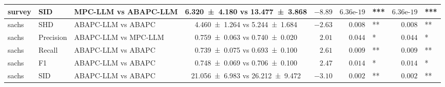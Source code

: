 \begin{table}[t]
{\begin{tabular}{ll l|c|r|rl|rl}
    survey & SID & MPC-LLM vs ABAPC-LLM & \num{6.320 +- 4.180} vs \num{13.477 +- 3.868} & $-8.89$ & $6.36\text{e-}19$ & \!\!\!*** & $6.36\text{e-}19$ & \!\!\!*** \\
    \midrule
    sachs & SHD & ABAPC-LLM vs ABAPC & \num{4.460 +- 1.264} vs \num{5.244 +- 1.684} & $-2.63$ & $0.008$ & \!\!\!** & $0.008$ & \!\!\!** \\
    sachs & Precision & ABAPC-LLM vs MPC-LLM & \num{0.759 +- 0.063} vs \num{0.740 +- 0.020} & $2.01$ & $0.044$ & \!\!\!* & $0.044$ & \!\!\!* \\
    sachs & Recall & ABAPC-LLM vs ABAPC & \num{0.739 +- 0.075} vs \num{0.693 +- 0.100} & $2.61$ & $0.009$ & \!\!\!** & $0.009$ & \!\!\!** \\
    sachs & F1 & ABAPC-LLM vs ABAPC & \num{0.748 +- 0.069} vs \num{0.706 +- 0.100} & $2.47$ & $0.014$ & \!\!\!* & $0.014$ & \!\!\!* \\
    sachs & SID & ABAPC-LLM vs ABAPC & \num{21.056 +- 6.983} vs \num{26.212 +- 9.472} & $-3.10$ & $0.002$ & \!\!\!** & $0.002$ & \!\!\!** \\
    \bottomrule
    \end{tabular}
    }
\end{table}
